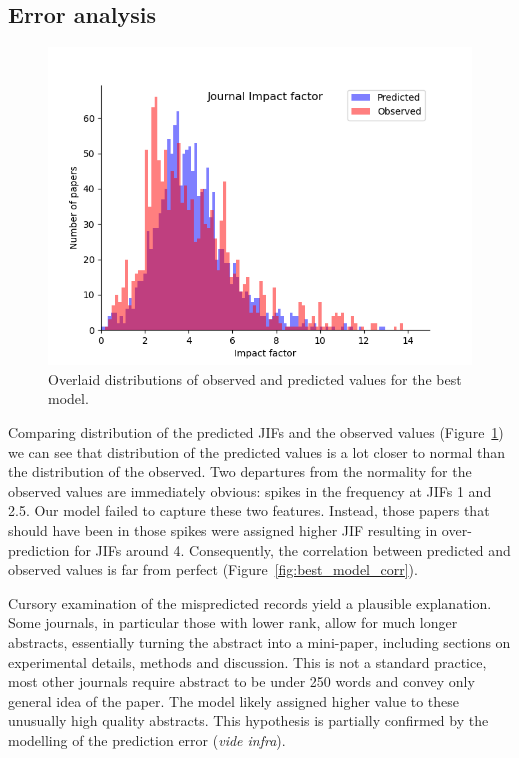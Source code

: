\documentclass[11pt]{article}
\begin{document}
\subsection{Error analysis}
\begin{figure}
	\includegraphics[width= \columnwidth]{./Images/JIF_hist.png}
	\caption{Overlaid distributions of observed and predicted values for the best model.}
	\label{fig:JIF_hist}
\end{figure}
Comparing distribution of the predicted JIFs and the observed values (Figure~\ref{fig:JIF_hist}) we can see that distribution of the predicted values is a lot closer to normal than the distribution of the observed. Two departures from the normality for the observed values are immediately obvious: spikes in the frequency at JIFs 1 and 2.5. Our model failed to capture these two features. Instead, those papers that should have been in those spikes were assigned higher JIF resulting in over-prediction for JIFs around 4.  Consequently, the correlation between predicted and observed values is far from perfect (Figure~\ref{fig:best_model_corr}). 

Cursory examination of the mispredicted records yield a plausible explanation. Some journals, in particular those with lower rank, allow for much longer abstracts, essentially turning the abstract into a mini-paper, including sections on experimental details, methods and discussion. This is not a standard practice, most other journals require abstract to be under 250 words and convey only general idea of the paper. The model likely assigned higher value to these unusually high quality abstracts. This hypothesis is partially confirmed by the modelling of the prediction error (\textit{vide infra}).
\end{document}
